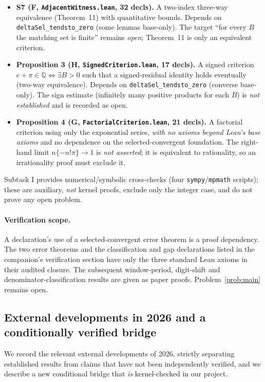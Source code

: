 \documentclass[11pt]{amsart}
\theoremstyle{definition}
\theoremstyle{remark}
\numberwithin{equation}{section}
\newcommand{\Q}{\mathbb{Q}}
\begin{document}
\begin{itemize}
\item \textbf{S7 (F, \texttt{AdjacentWitness.lean}, 32 decls).} A two-index three-way equivalence (Theorem~11) with quantitative bounds. Depends on \texttt{deltaSel\_\allowbreak{}tendsto\_\allowbreak{}zero} (some lemmas base-only). The target ``for every $B$ the matching set is finite'' remains \emph{open}; Theorem~11 is only an equivalent criterion.
\item \textbf{Proposition 3 (H, \texttt{SignedCriterion.lean}, 17 decls).} A signed criterion $e+\pi\in\Q\iff\exists B>0$ such that a signed-residual identity holds eventually (two-way equivalence). Depends on \texttt{deltaSel\_\allowbreak{}tendsto\_\allowbreak{}zero} (converse base-only). The sign estimate (infinitely many positive products for each $B$) is \emph{not established} and is recorded as open.
\item \textbf{Proposition 4 (G, \texttt{FactorialCriterion.lean}, 21 decls).} A factorial criterion using only the exponential series, \emph{with no axioms beyond Lean's base axioms} and no dependence on the selected-convergent foundation. The right-hand limit $n\{-n!\pi\}\to1$ is \emph{not asserted}; it is equivalent to rationality, so an irrationality proof must exclude it.
\end{itemize}
Subtask I provides numerical/symbolic cross-checks (four \texttt{sympy}/\texttt{mpmath} scripts); these are auxiliary, \emph{not} kernel proofs, exclude only the integer case, and do not prove any open problem.

\paragraph{Verification scope.}
A declaration's use of a selected-convergent error theorem is a proof
dependency. The two error theorems and the classification and gap
declarations listed in the companion's verification section have only
the three standard Lean axioms in their audited closure. The subsequent
window-period, digit-shift and denominator-classification results are
given as paper proofs. Problem~\ref{prob:main} remains open.

\subsection{External developments in 2026 and a conditionally verified bridge}\label{sec:lean-external}

We record the relevant external developments of 2026, strictly separating established results from claims that have not been independently verified, and we describe a new conditional bridge that \emph{is} kernel-checked in our project.
\end{document}
